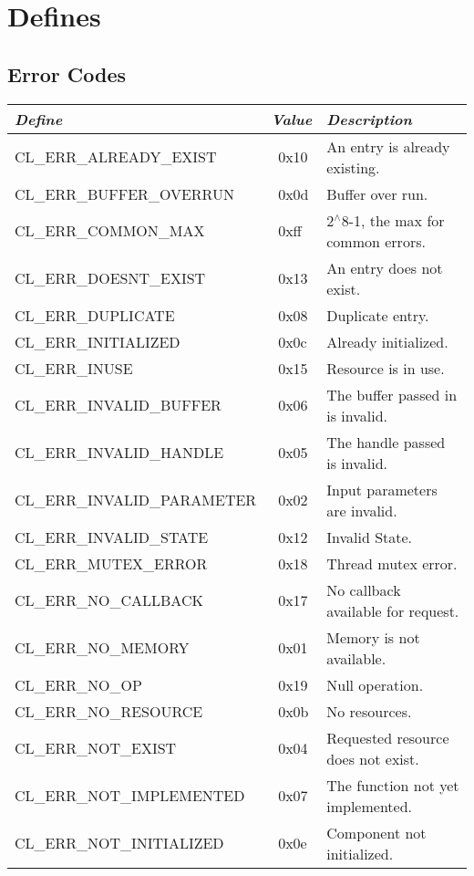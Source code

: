 \section{Defines}



\newpage
\subsection{Error Codes}
\begin{tabular}{|p{2in}|p{1in}|p{2in}|} \hline
\textbf{\textit{Define}} &\textbf{\textit{Value}} &\textbf{\textit{Description}} \\\hline
CL\_\-ERR\_\-ALREADY\_\-EXIST &~0x10 &An entry is already existing.\\
CL\_\-ERR\_\-BUFFER\_\-OVERRUN &~0x0d &Buffer over run.\\
CL\_\-ERR\_\-COMMON\_\-MAX &~0xff &2$^\wedge$8-1, the max for common errors. \\
CL\_\-ERR\_\-DOESNT\_\-EXIST &~0x13 &An entry does not exist.\\
CL\_\-ERR\_\-DUPLICATE &~0x08 &Duplicate entry.\\
CL\_\-ERR\_\-INITIALIZED &~0x0c &Already initialized.\\
CL\_\-ERR\_\-INUSE &~0x15 &Resource is in use.\\
CL\_\-ERR\_\-INVALID\_\-BUFFER &~0x06 &The buffer passed in is invalid.\\
CL\_\-ERR\_\-INVALID\_\-HANDLE &~0x05 &The handle passed is invalid.\\
CL\_\-ERR\_\-INVALID\_\-PARAMETER &~0x02 &Input parameters are invalid.\\
CL\_\-ERR\_\-INVALID\_\-STATE &~0x12 &Invalid State.\\
CL\_\-ERR\_\-MUTEX\_\-ERROR &~0x18 &Thread mutex error.\\
CL\_\-ERR\_\-NO\_\-CALLBACK &~0x17 &No callback available for request.\\
CL\_\-ERR\_\-NO\_\-MEMORY &~0x01 &Memory is not available.\\
CL\_\-ERR\_\-NO\_\-OP &~0x19 &Null operation.\\
CL\_\-ERR\_\-NO\_\-RESOURCE &~0x0b &No resources.\\
CL\_\-ERR\_\-NOT\_\-EXIST &~0x04 &Requested resource does not exist.\\
CL\_\-ERR\_\-NOT\_\-IMPLEMENTED &~0x07 &The function not yet implemented.\\
CL\_\-ERR\_\-NOT\_\-INITIALIZED &~0x0e &Component not initialized.\\

\end{tabular}
